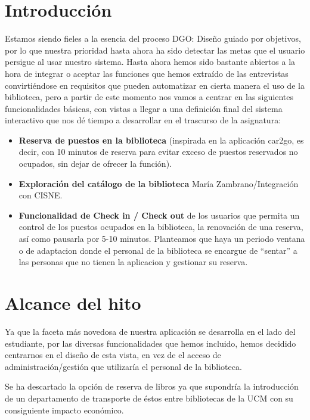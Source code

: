 \documentclass[12pt]{article}
\begin{document}
\section{Introducción}

Estamos siendo fieles a la esencia del proceso DGO: Diseño guiado por objetivos, por lo que nuestra prioridad hasta ahora ha sido detectar las metas que el usuario persigue al usar nuestro sistema. Hasta ahora hemos sido bastante abiertos a la hora de integrar o aceptar las funciones que hemos extraído de las entrevistas convirtiéndose en requisitos que pueden automatizar en cierta manera el uso de la biblioteca, pero a partir de este momento nos vamos a centrar en las siguientes funcionalidades básicas, con vistas a llegar a una definición final del sistema interactivo que nos dé tiempo a desarrollar en el trascurso de la asignatura:

\begin{itemize}

\item \textbf{Reserva de puestos en la biblioteca} (inspirada en la aplicación car2go, es decir, con 10 minutos de reserva para evitar exceso de puestos reservados no ocupados, sin dejar de ofrecer la función).
\item \textbf{Exploración del catálogo de la biblioteca} María Zambrano/Integración con CISNE.
\item \textbf{Funcionalidad de Check in / Check out} de los usuarios que permita un control de los puestos ocupados en la biblioteca, la renovación de una reserva, así como pausarla por 5-10 minutos. Planteamos que haya un periodo ventana o de adaptacion donde el personal de la biblioteca se encargue de “sentar” a las personas que no tienen la aplicacion y gestionar su reserva.

\newpage

\end{itemize}

\section{Alcance del hito}
Ya que la faceta más novedosa de nuestra aplicación se desarrolla en el lado del estudiante, por las diversas funcionalidades que hemos incluido, hemos decidido centrarnos en el diseño de esta vista, en vez de el acceso de administración/gestión que utilizaría el personal de la biblioteca.

Se ha descartado la opción de reserva de libros ya que supondría la introducción de un departamento de transporte de éstos entre bibliotecas de la UCM con su consiguiente impacto económico.
\end{document}
